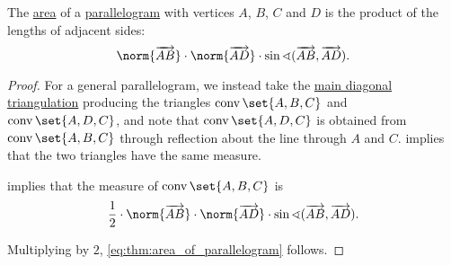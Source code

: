 \begin{proposition}\label{thm:area_of_parallelogram}
  The \hyperref[def:figure_area]{area} of a \hyperref[def:parallelogram]{parallelogram} with vertices \( A \), \( B \), \( C \) and \( D \) is the product of the lengths of adjacent sides:
  \begin{equation}\label{eq:thm:area_of_parallelogram}
    \norm{\vect{AB}} \cdot \norm{\vect{AD}} \cdot \sin\sphericalangle(\vect{AB}, \vect{AD}).
  \end{equation}
\end{proposition}
\begin{proof}
  For a general parallelogram, we instead take the \hyperref[thm__trapezoid_diagonal_triangulation]{main diagonal triangulation} producing the triangles \( \conv\set{ A, B, C } \) and \( \conv\set{ A, D, C } \), and note that \( \conv\set{ A, D, C } \) is obtained from \( \conv\set{ A, B, C } \) through reflection about the line through \( A \) and \( C \).  implies that the two triangles have the same measure.

   implies that the measure of \( \conv\set{ A, B, C } \) is
  \begin{equation*}
    \frac 1 2 \cdot \norm{\vect{AB}} \cdot \norm{\vect{AD}} \cdot \sin\sphericalangle(\vect{AB}, \vect{AD}).
  \end{equation*}

  Multiplying by \( 2 \), \eqref{eq:thm:area_of_parallelogram} follows.
\end{proof}
